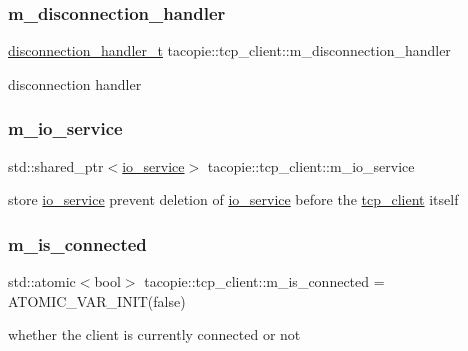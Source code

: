 \subsubsection{\texorpdfstring{m\+\_\+disconnection\+\_\+handler}{m\_disconnection\_handler}}
{\footnotesize\ttfamily \hyperlink{classtacopie_1_1tcp__client_aca5df52e5ee6fa673cf212532ada1453}{disconnection\+\_\+handler\+\_\+t} tacopie\+::tcp\+\_\+client\+::m\+\_\+disconnection\+\_\+handler\hspace{0.3cm}{\ttfamily [private]}}

disconnection handler \mbox{\label{classtacopie_1_1tcp__client_a2a5e4ae0f4fbcd375df4cb1f8070b993}} 
\subsubsection{\texorpdfstring{m\+\_\+io\+\_\+service}{m\_io\_service}}
{\footnotesize\ttfamily std\+::shared\+\_\+ptr$<$\hyperlink{classtacopie_1_1io__service}{io\+\_\+service}$>$ tacopie\+::tcp\+\_\+client\+::m\+\_\+io\+\_\+service\hspace{0.3cm}{\ttfamily [private]}}

store \hyperlink{classtacopie_1_1io__service}{io\+\_\+service} prevent deletion of \hyperlink{classtacopie_1_1io__service}{io\+\_\+service} before the \hyperlink{classtacopie_1_1tcp__client}{tcp\+\_\+client} itself \mbox{\label{classtacopie_1_1tcp__client_adf45ef6f910a7723fcfe543417f1feaf}} 
\subsubsection{\texorpdfstring{m\+\_\+is\+\_\+connected}{m\_is\_connected}}
{\footnotesize\ttfamily std\+::atomic$<$bool$>$ tacopie\+::tcp\+\_\+client\+::m\+\_\+is\+\_\+connected = A\+T\+O\+M\+I\+C\+\_\+\+V\+A\+R\+\_\+\+I\+N\+IT(false)\hspace{0.3cm}{\ttfamily [private]}}

whether the client is currently connected or not \mbox{\label{classtacopie_1_1tcp__client_a458754e266c0f41b42e17806cc59dc2a}} 
